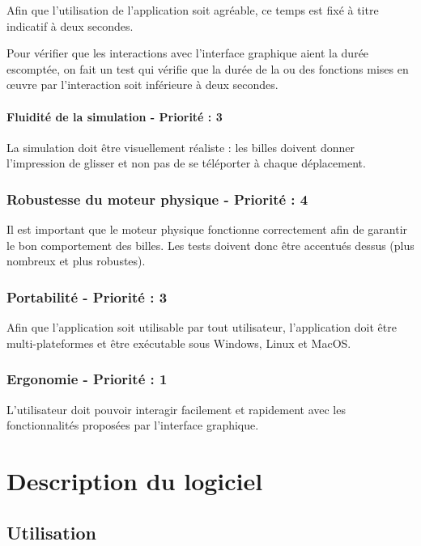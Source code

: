 \documentclass{report}
\begin{document}
Afin que l’utilisation de l’application soit agréable, ce temps est fixé à titre indicatif à deux secondes.

Pour vérifier que les interactions avec l’interface graphique aient la durée escomptée, on fait un test qui vérifie que la durée de la ou des fonctions mises en œuvre par l’interaction soit inférieure à deux secondes.


\subsubsection{Fluidité de la simulation - Priorité : 3}

La simulation doit être visuellement réaliste : les billes doivent donner l’impression de glisser et non pas de se téléporter à chaque déplacement.

\subsection{Robustesse du moteur physique - Priorité : 4}

Il est important que le moteur physique fonctionne correctement afin de garantir le bon comportement des billes. Les tests doivent donc être accentués dessus (plus nombreux et plus robustes).

\subsection{Portabilité - Priorité : 3}

Afin que l'application soit utilisable par tout utilisateur, l’application doit être multi-plateformes et être exécutable sous Windows, Linux et MacOS.

\subsection{Ergonomie - Priorité : 1}

L’utilisateur doit pouvoir interagir facilement et rapidement avec les fonctionnalités proposées par l’interface graphique.



\chapter{Description du logiciel}

\section{Utilisation}
\end{document}
